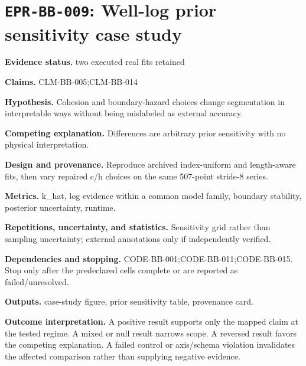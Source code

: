 \section[\texttt{EPR-BB-009}]{\texttt{EPR-BB-009}: Well-log prior sensitivity case study}
\textbf{Evidence status.} two executed real fits retained\par
\textbf{Claims.} CLM-BB-005;CLM-BB-014\par
\textbf{Hypothesis.} Cohesion and boundary-hazard choices change segmentation in interpretable ways without being mislabeled as external accuracy.\par
\textbf{Competing explanation.} Differences are arbitrary prior sensitivity with no physical interpretation.\par
\textbf{Design and provenance.} Reproduce archived index-uniform and length-aware fits, then vary repaired c/h choices on the same 507-point stride-8 series.\par
\textbf{Metrics.} k\_hat, log evidence within a common model family, boundary stability, posterior uncertainty, runtime.\par
\textbf{Repetitions, uncertainty, and statistics.} Sensitivity grid rather than sampling uncertainty; external annotations only if independently verified.\par
\textbf{Dependencies and stopping.} CODE-BB-001;CODE-BB-011;CODE-BB-015. Stop only after the predeclared cells complete or are reported as failed/unresolved.\par
\textbf{Outputs.} case-study figure, prior sensitivity table, provenance card.\par
\textbf{Outcome interpretation.} A positive result supports only the mapped claim at the tested regime. A mixed or null result narrows scope. A reversed result favors the competing explanation. A failed control or axis/schema violation invalidates the affected comparison rather than supplying negative evidence.

